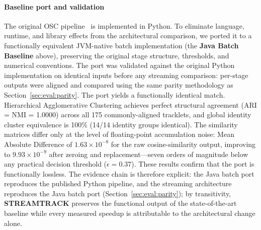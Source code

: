 \documentclass[review]{elsarticle}
\begin{document}
\paragraph{Baseline port and validation}
The original OSC pipeline~\cite{yoshida2024overlap} is implemented in Python. To eliminate language, runtime, and library effects from the architectural comparison, we ported it to a functionally equivalent JVM-native batch implementation (the \textbf{Java Batch Baseline} above), preserving the original stage structure, thresholds, and numerical conventions. The
port was validated against the original Python implementation on identical inputs before any streaming comparison: per-stage outputs were aligned and compared using the same parity
methodology as Section~\ref{sec:eval:parity}.
The port yields a functionally identical match. Hierarchical Agglomerative Clustering achieves perfect structural agreement (ARI = NMI = 1.0000) across all 175 commonly-aligned tracklets, and global identity cluster equivalence is 100\% (14/14 identity groups identical). The similarity matrices differ only at the level of floating-point accumulation noise: Mean Absolute Difference of $1.63 \times 10^{-8}$ for the raw cosine-similarity output, improving to $9.93 \times 10^{-9}$ after zeroing and replacement---seven orders of magnitude below any practical decision threshold ($\epsilon = 0.37$). These results confirm that the port is functionally lossless.
The evidence chain is therefore explicit: the Java batch port reproduces the published Python pipeline, and the streaming architecture reproduces the Java batch port (Section~\ref{sec:eval:parity}); by transitivity, \textbf{STREAMTRACK} preserves the functional output of the state-of-the-art baseline while every measured speedup is attributable to the architectural change alone.
\end{document}
